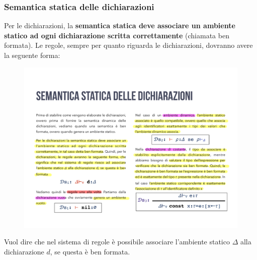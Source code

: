 \documentclass[a4paper]{article}
\begin{document}
	\subsubsection{Semantica statica delle dichiarazioni}
	
	Per le dichiarazioni, la \textbf{semantica statica deve associare un ambiente statico ad ogni dichiarazione scritta correttamente} (chiamata ben formata). Le regole, sempre per quanto riguarda le dichiarazioni, dovranno avere la seguente forma:
	\begin{figure}[!htp]
		\centering
		\includegraphics[width=.3\textwidth]{img/semantica_statica_dichiarazioni.pdf}
	\end{figure}

	\noindent
	Vuol dire che nel sistema di regole è possibile associare l'ambiente statico $\Delta$ alla dichiarazione $d$, se questa è ben formata.\newline
	
\end{document}
